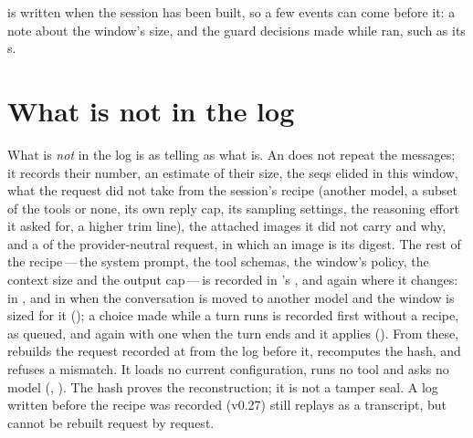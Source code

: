  is written when the session has been built, so a few
events can come before it: a note about the window's size, and the guard
decisions made while  ran, such as its s.

\section{What is not in the log}

What is \emph{not} in the log is as telling as what is. An 
does not repeat the messages; it records their number, an estimate of
their size, the seqs elided in this window, what the request did not take
from the session's recipe (another model, a subset of the tools or none,
its own reply cap, its sampling settings, the reasoning effort it asked for, a higher trim line), the
attached images it did not carry and why, and a  of
the provider-neutral request, in which an image is its digest. The rest of the
recipe\,---\,the system prompt, the tool schemas, the window's policy, the
context size and the output cap\,---\,is recorded in
's , and again where it changes: in
, and in  when the conversation is
moved to another model and the window is sized for it (); a choice made
while a turn runs is recorded first without a recipe, as queued, and again with
one when the turn ends and it applies (). From these,
 rebuilds the request recorded at
 from the log before it, recomputes the hash, and refuses a
mismatch. It loads no current configuration, runs no tool and asks no
model (, ). The hash
proves the reconstruction; it is not a tamper seal. A log written before
the recipe was recorded (v0.27) still replays as a transcript, but cannot
be rebuilt request by request.

